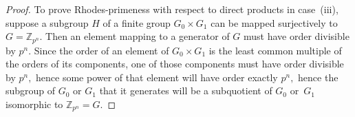 \documentclass[10pt,a4paper]{amsart}
\newcommand{\Z}{\mathbb{Z}}
\begin{document}
\begin{proof}
To prove Rhodes-primeness with respect to direct products
in case~(iii), suppose a subgroup $H$ of a finite group $G_0\times G_1$
can be mapped surjectively to $G=\Z_{p^n}.$
Then an element mapping to a generator of $G$ must
have order divisible by $p^n.$
Since the order of an element of $G_0\times G_1$ is the least
common multiple of the orders of its components, one of those
components must have order divisible by $p^n,$
hence some power of that element will have order exactly $p^n,$
hence the subgroup of $G_0$ or $G_1$ that it generates will
be a subquotient of $G_0$ or~$G_1$ isomorphic to $\Z_{p^n}=G.$
\end{proof}
\end{document}
